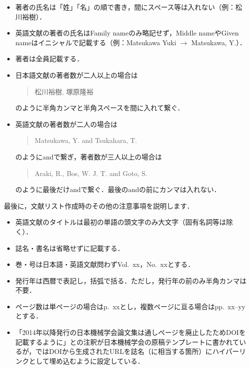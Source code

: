 \begin{tcolorbox}[enhanced, title=\textgt{文献リスト作成の注意事項（著者名）}, drop fuzzy shadow]
    \begin{itemize}
        \item 著者の氏名は「姓」「名」の順で書き，間にスペース等は入れない（例：松川裕樹）．
        \item 英語文献の著者の氏名はFamily nameのみ略記せず，Middle nameやGiven nameはイニシャルで記載する（例：Matsukawa Yuki $\to$ Matsukawa, Y.）．
        \item 著者は全員記載する．
        \item 日本語文献の著者数が二人以上の場合は
            \begin{quote}
                松川裕樹, 塚原隆裕        
            \end{quote}
            のように半角カンマと半角スペースを間に入れて繋ぐ．
        \item 英語文献の著者数が二人の場合は
            \begin{quote}
                Matsukawa, Y. and Tsukahara, T.        
            \end{quote}
            のようにandで繋ぎ，著者数が三人以上の場合は
            \begin{quote}
                Araki, R., Bos, W. J. T. and Goto, S.            
            \end{quote}
            のように最後だけandで繋ぐ．最後のandの前にカンマは入れない．
    \end{itemize}
\end{tcolorbox}
\noindent
最後に，文献リスト作成時のその他の注意事項を説明します．
\begin{tcolorbox}[enhanced, title=\textgt{文献リスト作成の注意事項（その他）}, drop fuzzy shadow]
    \begin{itemize}
        \item 英語文献のタイトルは最初の単語の頭文字のみ大文字（固有名詞等は除く）．
        \item 誌名・書名は省略せずに記載する．
        \item 巻・号は日本語・英語文献問わずVol.~xx，No.~xxとする．
        \item 発行年は西暦で表記し，括弧で括る．ただし，発行年の前のみ半角カンマは不要．
        \item ページ数は単ページの場合はp.~xxとし，複数ページに亘る場合はpp.~xx--yyとする．
        \item 「2014年以降発行の日本機械学会論文集は通しページを廃止したためDOIを記載するように」との注釈が日本機械学会の原稿テンプレートに書かれているが，\jsmefile ではDOIから生成されたURLを誌名（に相当する箇所）にハイパーリンクとして埋め込むように設定している．
    \end{itemize}
\end{tcolorbox}
